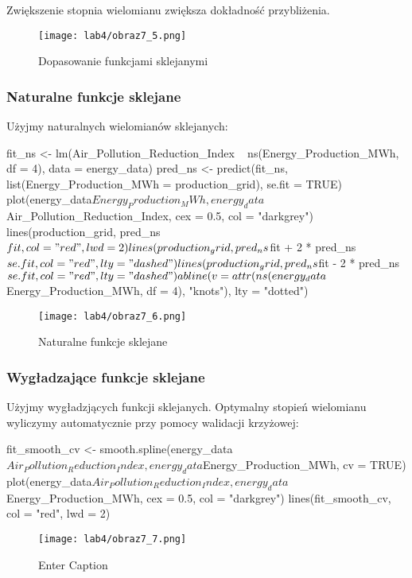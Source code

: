 Zwiększenie stopnia wielomianu zwiększa dokładność przybliżenia.

\begin{figure}[H]
    \centering
    \texttt{[image: lab4/obraz7\_5.png]}
    \caption{Dopasowanie funkcjami sklejanymi}
    \label{fig:enter-label}
\end{figure}

\subsubsection{Naturalne funkcje sklejane}
Użyjmy naturalnych wielomianów sklejanych:

\begin{Rcode}
fit_ns <- lm(Air_Pollution_Reduction_Index ~ ns(Energy_Production_MWh, df = 4), data = energy_data)
pred_ns <- predict(fit_ns, list(Energy_Production_MWh = production_grid), se.fit = TRUE)
plot(energy_data$Energy_Production_MWh, energy_data$Air_Pollution_Reduction_Index, cex = 0.5, col = "darkgrey")
lines(production_grid, pred_ns$fit, col = "red", lwd = 2)
lines(production_grid, pred_ns$fit + 2 * pred_ns$se.fit, col = "red",
      lty = "dashed")
lines(production_grid, pred_ns$fit - 2 * pred_ns$se.fit, col = "red",
      lty = "dashed")
abline(v = attr(ns(energy_data$Energy_Production_MWh, df = 4), "knots"), lty = "dotted")
\end{Rcode}

\begin{figure}[H]
    \centering
    \texttt{[image: lab4/obraz7\_6.png]}
    \caption{Naturalne funkcje sklejane}
    \label{fig:enter-label}
\end{figure}

\subsubsection{Wygładzające funkcje sklejane}
Użyjmy wygładzjących funkcji sklejanych. Optymalny stopień wielomianu wyliczymy automatycznie przy pomocy walidacji krzyżowej:

\begin{Rcode}
fit_smooth_cv <- smooth.spline(energy_data$Air_Pollution_Reduction_Index, energy_data$Energy_Production_MWh, cv = TRUE)
plot(energy_data$Air_Pollution_Reduction_Index, energy_data$Energy_Production_MWh, cex = 0.5, col = "darkgrey")
lines(fit_smooth_cv, col = "red", lwd = 2)
\end{Rcode}

\begin{figure}[H]
    \centering
    \texttt{[image: lab4/obraz7\_7.png]}
    \caption{Enter Caption}
    \label{fig:enter-label}
\end{figure}


